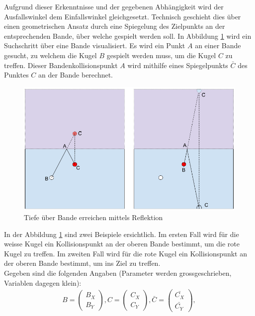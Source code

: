 Aufgrund dieser Erkenntnisse und der gegebenen Abhängigkeit wird der Ausfallswinkel dem Einfallswinkel gleichgesetzt.
Technisch geschieht dies über einen geometrischen Ansatz durch eine Spiegelung\cite{math.stackexchange:1}
des Zielpunkts an der entsprechenden Bande, über welche gespielt werden soll. In Abbildung \ref{fig:Tiefe über Bande erreichen mittels Reflektion}
wird ein Suchschritt über eine Bande visualisiert. Es wird ein Punkt $A$ an einer Bande gesucht, zu welchem die Kugel $B$
gespielt werden muss, um die Kugel $C$ zu treffen. Dieser Bandenkollisionspunkt $A$ wird mithilfe eines Spiegelpunkts $\bar{C}$
des Punktes $C$ an der Bande berechnet.
\begin{figure}[h!]
    \begin{center}
        \includegraphics[width=0.5\linewidth]{../common/03_billiard_ai/resources/47_rail_reflection_1.png}
    \end{center}
    \caption{Tiefe über Bande erreichen mittels Reflektion}
    \label{fig:Tiefe über Bande erreichen mittels Reflektion}
\end{figure}
In der Abbildung \ref{fig:Tiefe über Bande erreichen mittels Reflektion} sind zwei Beispiele ersichtlich.
Im ersten Fall wird für die weisse Kugel ein Kollisionspunkt an der oberen Bande bestimmt, um die rote Kugel zu treffen.
Im zweiten Fall wird für die rote Kugel ein Kollisionspunkt an der oberen Bande bestimmt, um ins Ziel zu treffen.\\
Gegeben sind die folgenden Angaben (Parameter werden grossgeschrieben, Variablen dagegen klein):
\begin{align}
    B = \begin{pmatrix}B_X\\B_Y\end{pmatrix},
    C = \begin{pmatrix}C_X\\C_Y\end{pmatrix},
    \bar{C} = \begin{pmatrix}\bar{C_X}\\\bar{C_Y}\end{pmatrix},
\end{align}
